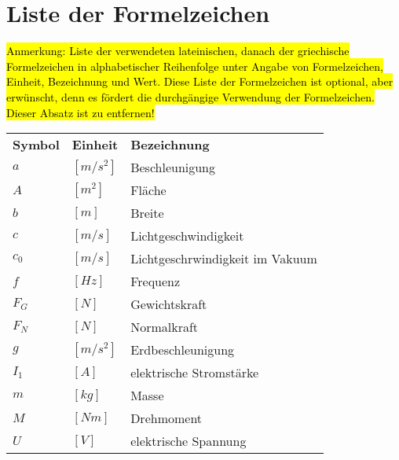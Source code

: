 
\section*{Liste der Formelzeichen}

\hl{
    Anmerkung: Liste der verwendeten lateinischen, danach der griechische Formelzeichen in
    alphabetischer Reihenfolge unter Angabe von Formelzeichen, Einheit, Bezeichnung und
    Wert. Diese Liste der Formelzeichen ist optional, aber erwünscht, denn es fördert die
    durchgängige Verwendung der Formelzeichen. Dieser Absatz ist zu entfernen!
}

\renewcommand{\arraystretch}{1.7}
\begin{tabular}{|m{2.5cm} m{2.5cm} m{8cm}|}

    \textbf{\large{Symbol}} & \textbf{\large{Einheit}} & \textbf{\large{Bezeichnung}}    \\ [0.1cm]
    $a$                     & $[m/s^2]$                & Beschleunigung                  \\
    $A$                     & $[m^2]$                  & Fläche                          \\
    $b$                     & $[m]$                    & Breite                          \\
    $c$                     & $[m/s]$                  & Lichtgeschwindigkeit            \\
    $c_0$                   & $[m/s]$                  & Lichtgeschrwindigkeit im Vakuum \\
    $f$                     & $[Hz]$                   & Frequenz                        \\
    $F_G$                   & $[N]$                    & Gewichtskraft                   \\
    $F_N$                   & $[N]$                    & Normalkraft                     \\
    $g$                     & $[m/s^2]$                & Erdbeschleunigung               \\
    $I_1$                   & $[A]$                    & elektrische Stromstärke         \\
    $m$                     & $[kg]$                   & Masse                           \\
    $M$                     & $[Nm]$                   & Drehmoment                      \\
    $U$                     & $[V]$                    & elektrische Spannung            \\

\end{tabular}
